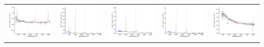 \begin{center}
\begin{longtable}{l l l l l }
    \includegraphics[width=0.19\linewidth, clip]{Figs/Figs-sdss/spec-9409-58051-0529-STRIPE82-0014-019228.pdf} & \includegraphics[width=0.19\linewidth, clip]{Figs/Figs-sdss/spec-0330-52370-0471-SPLUS-n03s21-043085.pdf} & \includegraphics[width=0.19\linewidth, clip]{Figs/Figs-sdss/spec-0331-52368-0215-SPLUS-n03s23-001039.pdf} & \includegraphics[width=0.19\linewidth, clip]{Figs/Figs-sdss/spec-0331-52368-0449-SPLUS-n02s23-034336.pdf} & \includegraphics[width=0.19\linewidth, clip]{Figs/Figs-sdss/spec-0332-52367-0306-SPLUS-n03s23-034002.pdf} \\

\end{longtable}
\end{center}
